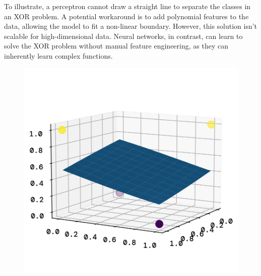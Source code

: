 \documentclass[twoside,11pt]{report}
\begin{document}
To illustrate, a perceptron cannot draw a straight line to separate the classes in an XOR problem. A potential workaround is to add polynomial features to the data, allowing the model to fit a non-linear boundary. However, this solution isn't scalable for high-dimensional data. Neural networks, in contrast, can learn to solve the XOR problem without manual feature engineering, as they can inherently learn complex functions.


    \begin{figure}[h]
        \begin{minipage}{0.5\textwidth - 1mm}
            \begin{center}
                \includegraphics[width=\textwidth]{../runsAndFigures/xor_plain.png}
                \caption{}\label{fig:xor_plain}
            \end{center}
        \end{minipage}
        \hspace{2mm}
        \begin{minipage}{0.5\textwidth - 1mm}
            \begin{center}

\end{center}
\end{minipage}
\end{figure}
\end{document}
